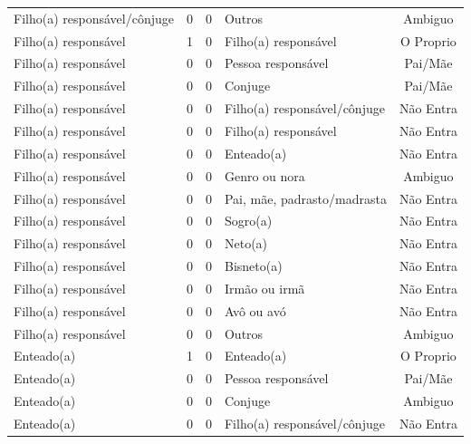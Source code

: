 \documentclass[
	12pt,				%
	openright,			%
	twoside,			%
	a4paper,			%
	english,			%
	french,				%
	spanish,			%
	brazil				%
	]{abntex2}
\begin{document}
\begin{anexosenv}
\begin{longtable}{@{}lcclc@{}}
Filho(a) responsável/cônjuge & 0         & 0        & Outros                       & Ambiguo         \\
Filho(a) responsável         & 1         & 0        & Filho(a) responsável         & O Proprio       \\
Filho(a) responsável         & 0         & 0        & Pessoa responsável           & Pai/Mãe         \\
Filho(a) responsável         & 0         & 0        & Conjuge                      & Pai/Mãe         \\
Filho(a) responsável         & 0         & 0        & Filho(a) responsável/cônjuge & Não Entra       \\
Filho(a) responsável         & 0         & 0        & Filho(a) responsável         & Não Entra       \\
Filho(a) responsável         & 0         & 0        & Enteado(a)                   & Não Entra       \\
Filho(a) responsável         & 0         & 0        & Genro ou nora                & Ambiguo         \\
Filho(a) responsável         & 0         & 0        & Pai, mãe, padrasto/madrasta  & Não Entra       \\
Filho(a) responsável         & 0         & 0        & Sogro(a)                     & Não Entra       \\
Filho(a) responsável         & 0         & 0        & Neto(a)                      & Não Entra       \\
Filho(a) responsável         & 0         & 0        & Bisneto(a)                   & Não Entra       \\
Filho(a) responsável         & 0         & 0        & Irmão ou irmã                & Não Entra       \\
Filho(a) responsável         & 0         & 0        & Avô ou avó                   & Não Entra       \\
Filho(a) responsável         & 0         & 0        & Outros                       & Ambiguo         \\
Enteado(a)                   & 1         & 0        & Enteado(a)                   & O Proprio       \\
Enteado(a)                   & 0         & 0        & Pessoa responsável           & Pai/Mãe         \\
Enteado(a)                   & 0         & 0        & Conjuge                      & Ambiguo         \\
Enteado(a)                   & 0         & 0        & Filho(a) responsável/cônjuge & Não Entra       \\

\end{longtable}
\end{anexosenv}
\end{document}
